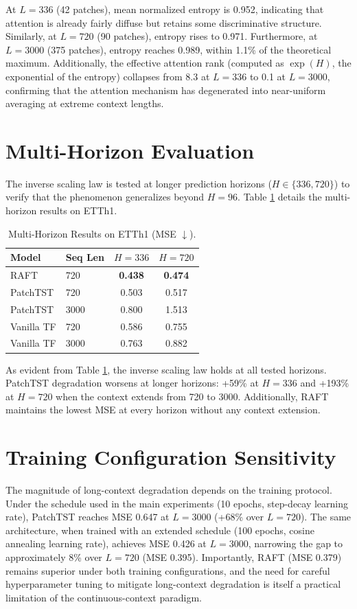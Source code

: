 \documentclass{article} %
\begin{document}
{At $L=336$ (42 patches), mean normalized entropy is 0.952, indicating that attention is already fairly diffuse but retains some discriminative structure. Similarly, at $L=720$ (90 patches), entropy rises to 0.971. Furthermore, at $L=3000$ (375 patches), entropy reaches 0.989, within 1.1\% of the theoretical maximum. Additionally, the effective attention rank (computed as $\exp(H)$, the exponential of the entropy) collapses from 8.3 at $L=336$ to 0.1 at $L=3000$, confirming that the attention mechanism has degenerated into near-uniform averaging at extreme context lengths.

\section{Multi-Horizon Evaluation} \label{sec:multi_horizon}

The inverse scaling law is tested at longer prediction horizons ($H \in \{336, 720\}$) to verify that the phenomenon generalizes beyond $H=96$. Table \ref{tab:multi_horizon} details the multi-horizon results on ETTh1.

\begin{table}[h]
\centering
\caption{Multi-Horizon Results on ETTh1 (MSE $\downarrow$).}
\label{tab:multi_horizon}
\small
\begin{tabular}{llcc}
\toprule
\textbf{Model} & \textbf{Seq Len} & \textbf{$H=336$} & \textbf{$H=720$} \\
\midrule
RAFT & 720 & \textbf{0.438} & \textbf{0.474} \\
PatchTST & 720 & 0.503 & 0.517 \\
PatchTST & 3000 & 0.800 & 1.513 \\
Vanilla TF & 720 & 0.586 & 0.755 \\
Vanilla TF & 3000 & 0.763 & 0.882 \\
\bottomrule
\end{tabular}
\end{table}

As evident from Table \ref{tab:multi_horizon}, the inverse scaling law holds at all tested horizons. PatchTST degradation worsens at longer horizons: +59\% at $H=336$ and +193\% at $H=720$ when the context extends from 720 to 3000. Additionally, RAFT maintains the lowest MSE at every horizon without any context extension.

\section{Training Configuration Sensitivity} \label{sec:sensitivity}

The magnitude of long-context degradation depends on the training protocol. Under the schedule used in the main experiments (10 epochs, step-decay learning rate), PatchTST reaches MSE 0.647 at $L=3000$ (+68\% over $L=720$). The same architecture, when trained with an extended schedule (100 epochs, cosine annealing learning rate), achieves MSE 0.426 at $L=3000$, narrowing the gap to approximately 8\% over $L=720$ (MSE 0.395). Importantly, RAFT (MSE 0.379) remains superior under both training configurations, and the need for careful hyperparameter tuning to mitigate long-context degradation is itself a practical limitation of the continuous-context paradigm.
}
\end{document}
